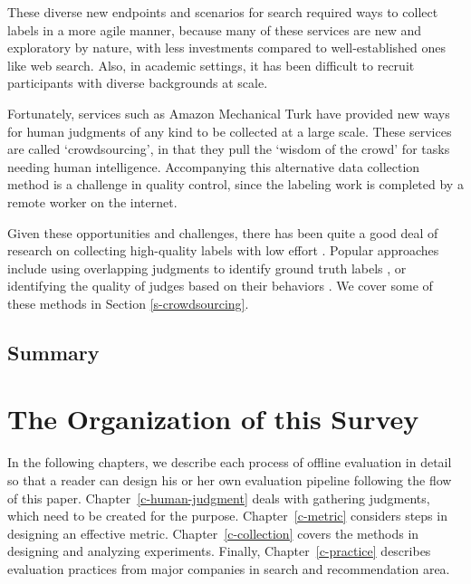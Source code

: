 These diverse new endpoints and scenarios for search required ways to collect labels in a more agile manner, because many of these services are new and exploratory by nature, with less investments compared to well-established ones like web search. Also, in academic settings, it has been difficult to recruit participants with diverse backgrounds at scale.

Fortunately, services such as Amazon Mechanical Turk have provided new ways for human judgments of any kind to be collected at a large scale. These services are called `crowdsourcing', in that they pull the `wisdom of the crowd' for tasks needing human intelligence. Accompanying this alternative data collection method is a challenge in quality control, since the labeling work is completed by a remote worker on the internet.

Given these opportunities and challenges, there has been quite a good deal of research on collecting high-quality labels with low effort \citep{Alonso2012}. Popular approaches include using overlapping judgments to identify ground truth labels \citep{Venanzi:2014}, or identifying the quality of judges based on their behaviors \citep{Kazai:2016}. We cover some of these methods in Section \ref{s-crowdsourcing}.


\subsection{Summary}


\section{The Organization of this Survey}

In the following chapters, we describe each process of offline evaluation in detail so that a reader can design his or her own evaluation pipeline following the flow of this paper. Chapter~\ref{c-human-judgment} deals with gathering judgments, which need to be created for the purpose. Chapter~\ref{c-metric} considers steps in designing an effective metric. Chapter~\ref{c-collection} covers the methods in designing and analyzing experiments. Finally, Chapter~\ref{c-practice} describes evaluation practices from major companies in search and recommendation area.

